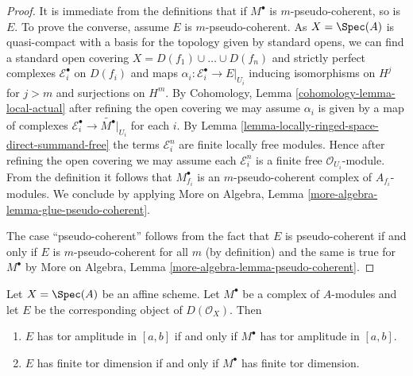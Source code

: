 \begin{proof}
It is immediate from the definitions that if $M^\bullet$ is
$m$-pseudo-coherent, so is $E$. To prove the converse, assume
$E$ is $m$-pseudo-coherent. As $X = \Spec(A)$ is quasi-compact with
a basis for the topology given by standard opens, we can find a standard
open covering $X = D(f_1) \cup \ldots \cup D(f_n)$ and strictly
perfect complexes $\mathcal{E}_i^\bullet$ on $D(f_i)$ and
maps $\alpha_i : \mathcal{E}_i^\bullet \to E|_{U_i}$ inducing
isomorphisms on $H^j$ for $j > m$ and surjections on $H^m$.
By Cohomology, Lemma \ref{cohomology-lemma-local-actual}
after refining the open covering
we may assume $\alpha_i$ is given by a map of complexes
$\mathcal{E}_i^\bullet \to \widetilde{M^\bullet}|_{U_i}$
for each $i$. By Lemma \ref{lemma-locally-ringed-space-direct-summand-free}
the terms $\mathcal{E}_i^n$ are finite locally free modules.
Hence after refining the open covering we may assume each
$\mathcal{E}_i^n$ is a finite free $\mathcal{O}_{U_i}$-module.
From the definition it follows that $M^\bullet_{f_i}$ is
an $m$-pseudo-coherent complex of $A_{f_i}$-modules.
We conclude by applying
More on Algebra, Lemma \ref{more-algebra-lemma-glue-pseudo-coherent}.

\medskip\noindent
The case ``pseudo-coherent'' follows from the fact that $E$ is
pseudo-coherent if and only if $E$ is $m$-pseudo-coherent for
all $m$ (by definition) and the same is true for $M^\bullet$
by More on Algebra, Lemma \ref{more-algebra-lemma-pseudo-coherent}.
\end{proof}

\begin{lemma}
\label{lemma-tor-dimension-affine}
Let $X = \Spec(A)$ be an affine scheme. Let $M^\bullet$ be a
complex of $A$-modules and let $E$ be the corresponding object
of $D(\mathcal{O}_X)$. Then
\begin{enumerate}
\item $E$ has tor amplitude in $[a, b]$ if and only if $M^\bullet$
has tor amplitude in $[a, b]$.
\item $E$ has finite tor dimension if and only if $M^\bullet$
has finite tor dimension.
\end{enumerate}
\end{lemma}

